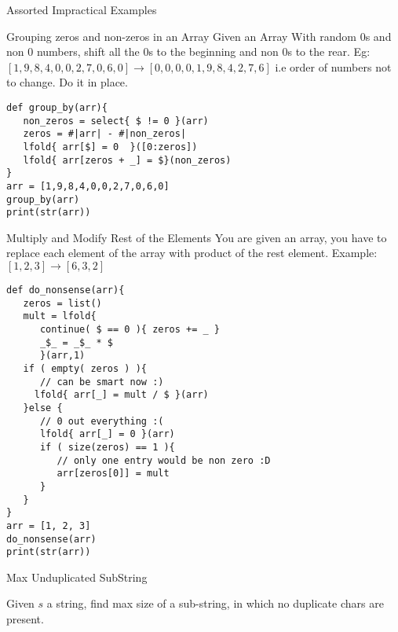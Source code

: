 \begin{section}{Assorted Impractical Examples}
\begin{subsection}{Grouping zeros and non-zeros in an Array}
Given an Array With random $0$s and non $0$ numbers, shift all the $0$s to the beginning and non $0$s to the rear. 
Eg: $[1,9,8,4,0,0,2,7,0,6,0] \to  [0,0,0,0,1,9,8,4,2,7,6]$ i.e order of numbers not to change. Do it in place.

\begin{center}\begin{minipage}{\linewidth}
\begin{lstlisting}[style=JexlStyle]
def group_by(arr){
   non_zeros = select{ $ != 0 }(arr)
   zeros = #|arr| - #|non_zeros|
   lfold{ arr[$] = 0  }([0:zeros])
   lfold{ arr[zeros + _] = $}(non_zeros)
}
arr = [1,9,8,4,0,0,2,7,0,6,0]
group_by(arr)
print(str(arr))
\end{lstlisting}  
\end{minipage}\end{center} 

\end{subsection}

\begin{subsection}{Multiply and Modify Rest of the Elements}
You are given an array, you have to replace each element of the array with product of the rest element. 
Example: $[1,2,3] \to [6,3,2]$

\begin{center}\begin{minipage}{\linewidth}
\begin{lstlisting}[style=JexlStyle]
def do_nonsense(arr){
   zeros = list() 
   mult = lfold{
      continue( $ == 0 ){ zeros += _ }
      _$_ = _$_ * $  
      }(arr,1)
   if ( empty( zeros ) ){
      // can be smart now :)
     lfold{ arr[_] = mult / $ }(arr)
   }else {
      // 0 out everything :(
      lfold{ arr[_] = 0 }(arr)
      if ( size(zeros) == 1 ){
         // only one entry would be non zero :D
         arr[zeros[0]] = mult
      }
   }
}
arr = [1, 2, 3]
do_nonsense(arr)
print(str(arr))
\end{lstlisting}  
\end{minipage}\end{center} 
\end{subsection}

\begin{subsection}{Max Unduplicated SubString}

Given $s$ a string, find max size of a sub-string, 
in which no duplicate chars are present.


\end{subsection}
\end{section}

